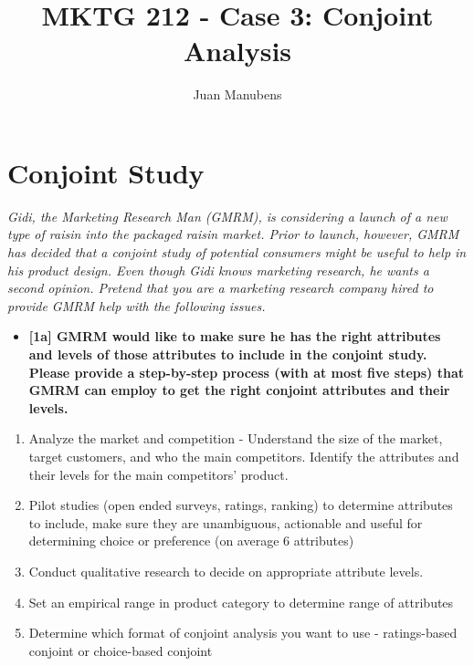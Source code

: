 \documentclass[10pt, oneside,spanish]{article}
\title{MKTG 212 - Case 3: Conjoint Analysis} \lstset{language=R}
\author[]{Juan Manubens}
\affil[]{University of Pennsylvania}
\date{}
\begin{document}
\maketitle







\section{Conjoint Study}

\textit{Gidi, the Marketing Research Man (GMRM), is considering a launch of a new type of raisin into the packaged raisin market.  Prior to launch, however, GMRM has decided that a conjoint study of potential consumers might be useful to help in his product design.  Even though Gidi knows marketing research, he wants a second opinion. Pretend that you are a marketing research company hired to provide GMRM help with the following issues.}

\begin{itemize}
\item \textbf{[1a] GMRM would like to make sure he has the right attributes and levels of those attributes to include in the conjoint study.  Please provide a step-by-step process (with at most five steps) that GMRM can employ to get the right conjoint attributes and their levels.  }
\end{itemize}

\begin{enumerate}
\item Analyze the market and competition - Understand the size of the market, target customers, and who the main competitors. Identify the attributes and their levels for the main competitors’ product. 
\item Pilot studies (open ended surveys, ratings, ranking) to determine attributes to include, make sure they are unambiguous, actionable and useful for determining choice or preference (on average 6 attributes)
\item Conduct qualitative research to decide on appropriate attribute levels. 
\item Set an empirical range in product category to determine range of attributes
\item Determine which format of conjoint analysis you want to use - ratings-based conjoint or choice-based conjoint
\end{enumerate}
\end{document}
